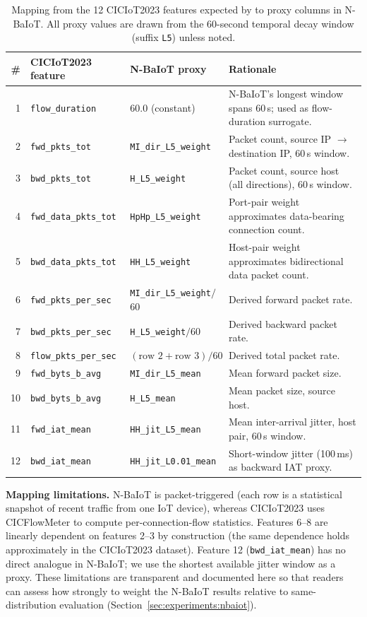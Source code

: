 \begin{table}[h]
\centering
\small
\caption{
  Mapping from the 12 CICIoT2023 features expected by \ours{} to
  proxy columns in N-BaIoT.  All proxy values are drawn from the
  60-second temporal decay window (suffix \texttt{L5}) unless noted.
}
\label{tab:nbaiot_mapping}
\begin{tabular}{rllp{5.0cm}}
\toprule
\# & CICIoT2023 feature & N-BaIoT proxy & Rationale \\
\midrule
1  & \texttt{flow\_duration}     & 60.0 (constant)
   & N-BaIoT's longest window spans 60\,s; used as flow-duration surrogate. \\
2  & \texttt{fwd\_pkts\_tot}     & \texttt{MI\_dir\_L5\_weight}
   & Packet count, source IP $\to$ destination IP, 60\,s window. \\
3  & \texttt{bwd\_pkts\_tot}     & \texttt{H\_L5\_weight}
   & Packet count, source host (all directions), 60\,s window. \\
4  & \texttt{fwd\_data\_pkts\_tot} & \texttt{HpHp\_L5\_weight}
   & Port-pair weight approximates data-bearing connection count. \\
5  & \texttt{bwd\_data\_pkts\_tot} & \texttt{HH\_L5\_weight}
   & Host-pair weight approximates bidirectional data packet count. \\
6  & \texttt{fwd\_pkts\_per\_sec}  & \texttt{MI\_dir\_L5\_weight}$/$60
   & Derived forward packet rate. \\
7  & \texttt{bwd\_pkts\_per\_sec}  & \texttt{H\_L5\_weight}$/$60
   & Derived backward packet rate. \\
8  & \texttt{flow\_pkts\_per\_sec} & $(\text{row 2}+\text{row 3})/60$
   & Derived total packet rate. \\
9  & \texttt{fwd\_byts\_b\_avg}    & \texttt{MI\_dir\_L5\_mean}
   & Mean forward packet size. \\
10 & \texttt{bwd\_byts\_b\_avg}    & \texttt{H\_L5\_mean}
   & Mean packet size, source host. \\
11 & \texttt{fwd\_iat\_mean}       & \texttt{HH\_jit\_L5\_mean}
   & Mean inter-arrival jitter, host pair, 60\,s window. \\
12 & \texttt{bwd\_iat\_mean}       & \texttt{HH\_jit\_L0.01\_mean}
   & Short-window jitter (100\,ms) as backward IAT proxy. \\
\bottomrule
\end{tabular}
\end{table}

\noindent\textbf{Mapping limitations.}
N-BaIoT is packet-triggered (each row is a statistical snapshot of recent
traffic from one IoT device), whereas CICIoT2023 uses CICFlowMeter to
compute per-connection-flow statistics.  Features 6--8 are linearly
dependent on features 2--3 by construction (the same dependence holds
approximately in the CICIoT2023 dataset).  Feature 12 (\texttt{bwd\_iat\_mean})
has no direct analogue in N-BaIoT; we use the shortest available jitter
window as a proxy.  These limitations are transparent and documented here
so that readers can assess how strongly to weight the N-BaIoT results
relative to same-distribution evaluation (Section~\ref{sec:experiments:nbaiot}).

